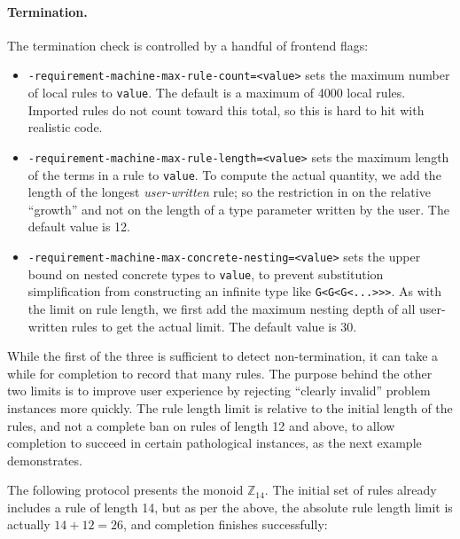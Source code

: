 \documentclass[../generics]{subfiles}
\begin{document}
\paragraph{Termination.} The termination check is controlled by a handful of frontend flags:
\begin{itemize}
\item {} \texttt{-requirement-machine-max-rule-count=<value>} sets the maximum number of local rules to \texttt{value}. The default is a maximum of 4000 local rules. Imported rules do not count toward this total, so this is hard to hit with realistic code.

\item {} \texttt{-requirement-machine-max-rule-length=<value>} sets the maximum length of the terms in a rule to \texttt{value}. To compute the actual quantity, we add the length of the longest \emph{user-written} rule; so the restriction in on the relative ``growth'' and not on the length of a type parameter written by the user. The default value is 12.

\item {} \texttt{-requirement-machine-max-concrete-nesting=<value>} sets the upper bound on nested concrete types to \texttt{value}, to prevent substitution simplification from constructing an infinite type like \texttt{G<G<G<...>>>}. As with the limit on rule length, we first add the maximum nesting depth of all user-written rules to get the actual limit. The default value is 30.
\end{itemize}

While the first of the three is sufficient to detect non-termination, it can take a while for completion to record that many rules. The purpose behind the other two limits is to improve user experience by rejecting ``clearly invalid'' problem instances more quickly. The rule length limit is relative to the initial length of the rules, and not a complete ban on rules of length 12 and above, to allow completion to succeed in certain pathological instances, as the next example demonstrates.

\begin{example}
The following protocol presents the monoid $\mathbb{Z}_{14}$. The initial set of rules already includes a rule of length 14, but as per the above, the absolute rule length limit is actually $14+12=26$, and completion finishes successfully:
\end{example}
\end{document}
